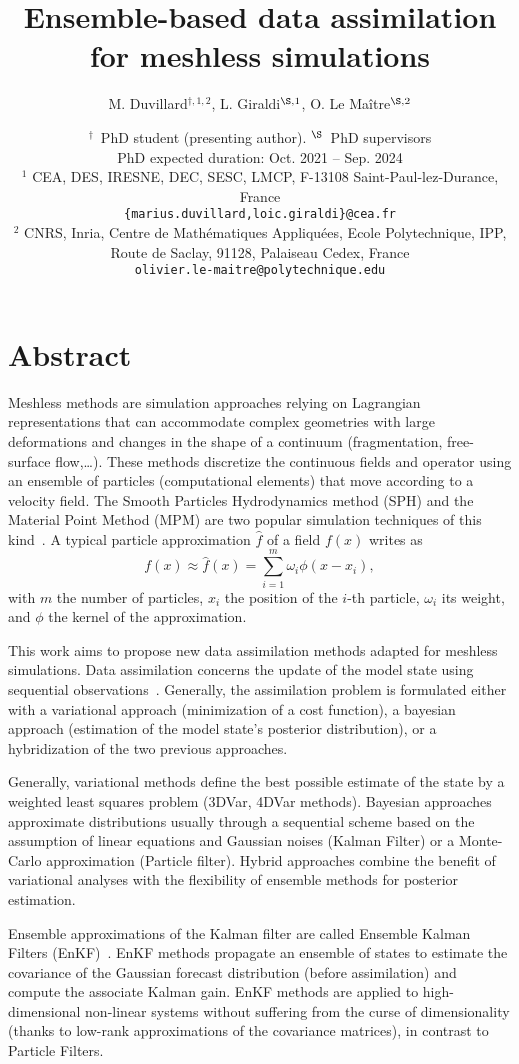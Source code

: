 \documentclass[a4paper,10pt,oneside]{article}
\title{%
  Ensemble-based data assimilation for meshless simulations}
\author{%
  M. Duvillard${}^{\dagger,1,2}$, %
  L. Giraldi${}^{\S,1}$, %
  O. Le Maître${}^{\S,2}$}%
\date{\medskip%
  \small %
  ${}^\dagger$\ PhD student (presenting author). \quad ${}^{\S}$\ PhD supervisors\\[5pt]
  PhD expected duration: {Oct. 2021 -- Sep. 2024}\\[15pt]
  ${}^1$  CEA, DES, IRESNE, DEC, SESC, LMCP, F-13108 Saint-Paul-lez-Durance, France\\
  \texttt{\{marius.duvillard,loic.giraldi\}@cea.fr}\\[4pt]
  ${}^2$ CNRS, Inria, Centre de Mathématiques Appliquées, Ecole Polytechnique, IPP, Route de Saclay, 91128, Palaiseau Cedex, France\\
  \texttt{olivier.le-maitre@polytechnique.edu}}
\begin{document}
\maketitle

\thispagestyle{fancy}

\section*{Abstract}

Meshless methods are simulation approaches relying on Lagrangian representations that can accommodate complex geometries with large deformations and changes in the shape of a continuum (fragmentation, free-surface flow,\dots).
These methods discretize the continuous fields and operator using an ensemble of particles (computational elements) that move according to a velocity field. The Smooth Particles Hydrodynamics method (SPH) and the Material Point Method (MPM) are two popular simulation techniques of this kind~\cite{de_vaucorbeil_material_2020,zhang_smoothed_2022}. A typical particle approximation $\hat{f}$ of a field $f(x)$ writes as
\[
  f(x) \approx \hat{f} (x) = \sum_{i=1}^m \omega_i \phi(x-x_i),
\]
with $m$ the number of particles, $x_i$ the position of the $i$-th particle, $\omega_i$ its weight, and $\phi$ the kernel of the approximation.

This work aims to propose new data assimilation methods adapted for meshless simulations. Data assimilation concerns the update of the model state using sequential observations~\cite{asch_data_2016,evensen_data_2022}. Generally, the assimilation problem is formulated either with a variational approach (minimization of a cost function), a bayesian approach (estimation of the model state's posterior distribution), or a hybridization of the two previous approaches.

Generally, variational methods define the best possible estimate of the state by a weighted least squares problem (3DVar, 4DVar methods). Bayesian approaches approximate distributions usually through a sequential scheme based on the assumption of linear equations and Gaussian noises (Kalman Filter) or a Monte-Carlo approximation (Particle filter). Hybrid approaches combine the benefit of variational analyses with the flexibility of ensemble methods for posterior estimation.

Ensemble approximations of the Kalman filter are called Ensemble Kalman Filters (EnKF)~\cite{evensen_sequential_1994}. EnKF methods propagate an ensemble of states to estimate the covariance of the Gaussian forecast distribution (before assimilation) and compute the associate Kalman gain. EnKF methods are applied to high-dimensional non-linear systems without suffering from the curse of dimensionality (thanks to low-rank approximations of the covariance matrices), in contrast to Particle Filters.
\end{document}
